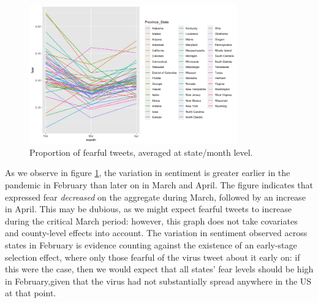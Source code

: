 \documentclass{article}
\begin{document}
\begin{figure}[h!]
  \includegraphics[width=0.8\textwidth]{figs/sent_time.png}    
  \centering
  \caption{Proportion of fearful tweets, averaged at state/month level.}
  \label{sent_time}
\end{figure}


As we observe in figure \ref{sent_time}, the variation in sentiment is greater earlier in the pandemic in February than later on in March and April.  The figure indicates that expressed fear \textit{decreased} on the aggregate during March, followed by an increase in April. This may be dubious, as we might expect fearful tweets to increase during the critical March period: however, this graph does not take covariates and county-level effects into account. The variation in sentiment observed across states in February is evidence counting against the existence of an early-stage selection effect, where only those fearful of the virus tweet about it early on: if this were the case, then we would expect that all states' fear levels should be high in February,given that the virus had not substantially spread anywhere in the US at that point.
\end{document}
